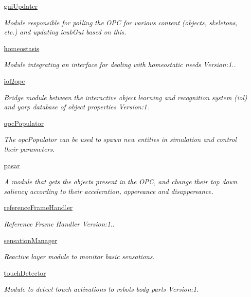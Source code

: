 \begin{DoxyCompactItemize}
\hyperlink{group__guiUpdater}{gui\+Updater}
\begin{DoxyCompactList}\small\item\em Module responsible for polling the O\+PC for various content (objects, skeletons, etc.) and updating icub\+Gui based on this. \end{DoxyCompactList}\item 
\hyperlink{group__homeostasis}{homeostasis}
\begin{DoxyCompactList}\small\item\em Module integrating an interface for dealing with homeostatic needs Version\+:1.. \end{DoxyCompactList}\item 
\hyperlink{group__iol2opc}{iol2opc}
\begin{DoxyCompactList}\small\item\em Bridge module between the interactive object learning and recognition system (iol) and yarp database of object properties Version\+:1. \end{DoxyCompactList}\item 
\hyperlink{group__opcPopulator}{opc\+Populator}
\begin{DoxyCompactList}\small\item\em The opc\+Populator can be used to spawn new entities in simulation and control their parameters. \end{DoxyCompactList}\item 
\hyperlink{group__pasar}{pasar}
\begin{DoxyCompactList}\small\item\em A module that gets the objects present in the O\+PC, and change their top down saliency according to their acceleration, appereance and disappereance. \end{DoxyCompactList}\item 
\hyperlink{group__referenceFrameHandler}{reference\+Frame\+Handler}
\begin{DoxyCompactList}\small\item\em Reference Frame Handler Version\+:1.. \end{DoxyCompactList}\item 
\hyperlink{group__sensationManager}{sensation\+Manager}
\begin{DoxyCompactList}\small\item\em Reactive layer module to monitor basic sensations. \end{DoxyCompactList}\item 
\hyperlink{group__touchDetector}{touch\+Detector}
\begin{DoxyCompactList}\small\item\em Module to detect touch activations to robot\textquotesingle{}s body parts Version\+:1. \end{DoxyCompactList}\end{DoxyCompactItemize}


